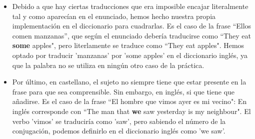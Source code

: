 \documentclass[a4paper]{article}
\begin{document}
\begin{itemize}
            \item Debido a que hay ciertas traducciones que era imposible encajar literalmente tal y como aparecían en el enunciado, hemos hecho nuestra propia implementación en el diccionario para cuadrarlas. Es el caso de la frase ``Ellos comen manzanas'', que según el enunciado debería traducirse como ``They eat \textbf{some} apples", pero literlamente se traduce como ``They eat apples". Hemos optado por traducir 'manzanas' por 'some apples' en el diccionario inglés, ya que la palabra no se utiliza en ningún otro caso de la práctica.

            \item Por último, en castellano, el sujeto no siempre tiene que estar presente en la frase para que sea comprensible. Sin embargo, en inglés, si que tiene que añadirse. Es el caso de la frase ``El hombre que vimos ayer es mi vecino": En inglés corresponde con ``The man that \textbf{we} saw yesterday is my neighbour". El verbo 'vimos' se traduciría como 'saw', pero sabiendo el número de la conjugación, podemos definirlo en el diccionario inglés como 'we saw'.

        \end{itemize}

    
    
\end{document}
